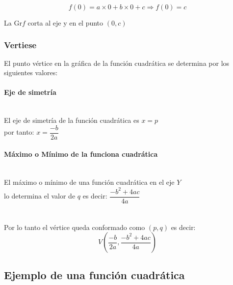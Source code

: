 $$f(0)= a \times 0 + b \times 0 + c \Rightarrow f(0)= c$$

La Gr$f$ corta al eje y en el punto $(0, c)$
\subsubsection{Vertiese } 

El punto vértice en la gráfica de la función cuadrática se determina por 
los siguientes valores:

\paragraph{Eje de simetría}
\quad \\El eje de simetría de la función cuadrática es $x = p$ \\
por tanto: $ x = \dfrac{-b}{2a} $

\paragraph{Máximo o Mínimo de la funciona cuadrática}
 
\quad \\El máximo o mínimo de una función cuadrática en el eje $Y$ \\
 lo determina el valor de $q$ es decir: $\dfrac{-b^{2}+4ac}{4a}$\\\\\\
Por lo tanto el vértice queda conformado como $(p, q)$ es decir:
$$ V\left( \dfrac{-b}{2a} , \dfrac{-b^{2}+4ac}{4a}\right)$$
\newpage
\subsection{Ejemplo de una función cuadrática}

